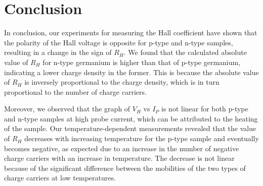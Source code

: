 \section{Conclusion}

	In conclusion, our experiments for measuring the Hall coefficient have shown that the polarity of the Hall voltage is opposite for p-type and n-type samples, resulting in a change in the sign of $R_H$. We found that the calculated absolute value of $R_H$ for n-type germanium is higher than that of p-type germanium, indicating a lower charge density in the former. This is because the absolute value of $R_H$ is inversely proportional to the charge density, which is in turn proportional to the number of charge carriers.

	Moreover, we observed that the graph of $V_H$ vs $I_P$ is not linear for both p-type and n-type samples at high probe current, which can be attributed to the heating of the sample. Our temperature-dependent measurements revealed that the value of $R_H$ decreases with increasing temperature for the p-type sample and eventually becomes negative, as expected due to an increase in the number of negative charge carriers with an increase in temperature. The decrease is not linear because of the significant difference between the mobilities of the two types of charge carriers at low temperatures.
